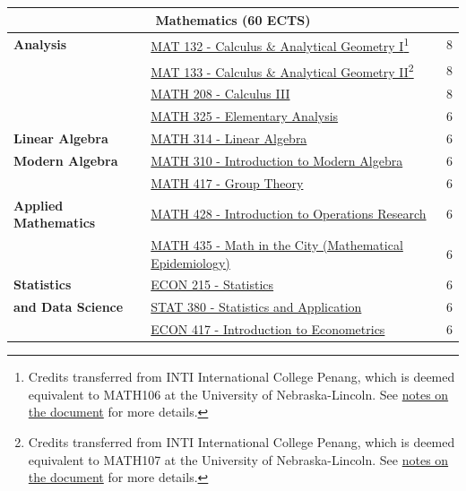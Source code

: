 \begin{longtable}{p{5cm} p{8cm} c}
\midrule
\multicolumn{3}{c}{\textbf{Mathematics (60 ECTS)}} \\
\midrule

\textbf{Analysis} 
& \hyperref[math106]{MAT 132 - Calculus \& Analytical Geometry I}\footnote{Credits transferred from INTI International College Penang, which is deemed equivalent to MATH106 at the University of Nebraska-Lincoln. See \hyperref[sec: notes on document]{notes on the document} for more details.} & 8 \\
& \hyperref[math107]{MAT 133 - Calculus \& Analytical Geometry II}\footnote{Credits transferred from INTI International College Penang, which is deemed equivalent to MATH107 at the University of Nebraska-Lincoln. See \hyperref[sec: notes on document]{notes on the document} for more details.} & 8 \\
& \hyperref[math208]{MATH 208 - Calculus III} & 8 \\
& \hyperref[math325]{MATH 325 - Elementary Analysis} & 6 \\

\midrule

\textbf{Linear Algebra} 
& \hyperref[math314]{MATH 314 - Linear Algebra} & 6 \\
\textbf{Modern Algebra}
& \hyperref[math310]{MATH 310 - Introduction to Modern Algebra} & 6 \\
& \hyperref[math417]{MATH 417 - Group Theory} & 6 \\
\midrule

\textbf{Applied Mathematics}
& \hyperref[math428]{MATH 428 - Introduction to Operations Research} & 6 \\
& \hyperref[math435]{MATH 435 - Math in the City (Mathematical Epidemiology)} & 6 \\
\midrule

\textbf{Statistics} 
& \hyperref[econ215]{ECON 215 - Statistics} & 6 \\
\textbf{and Data Science} 
& \hyperref[stat380]{STAT 380 - Statistics and Application} & 6 \\
& \hyperref[econ417]{ECON 417 - Introduction to Econometrics} & 6 \\

\bottomrule
\end{longtable}
